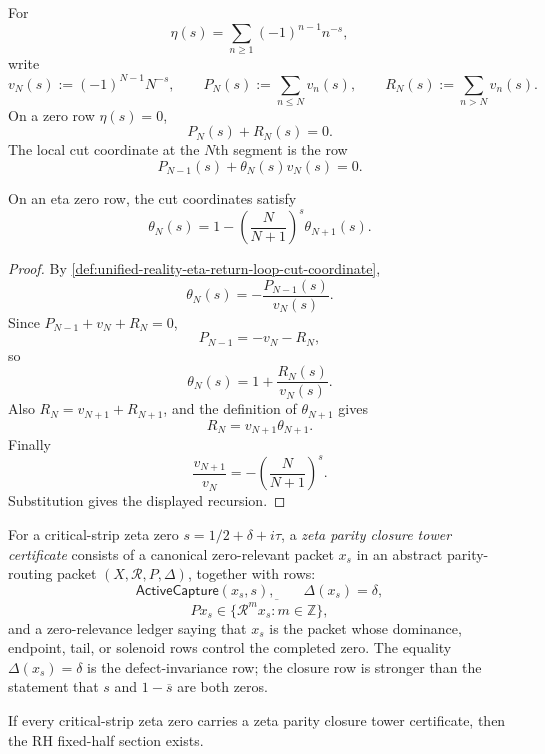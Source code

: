 \begin{definition}
\label{def:unified-reality-eta-return-loop-cut-coordinate}
For
$$
\eta(s)=\sum_{n\ge1}(-1)^{n-1}n^{-s},
$$
write
$$
v_N(s):=(-1)^{N-1}N^{-s},
\qquad
P_N(s):=\sum_{n\le N}v_n(s),
\qquad
R_N(s):=\sum_{n>N}v_n(s).
$$
On a zero row $\eta(s)=0$,
$$
P_N(s)+R_N(s)=0.
$$
The local cut coordinate at the $N$th segment is the row
$$
P_{N-1}(s)+\theta_N(s)v_N(s)=0.
$$
\end{definition}

\begin{theorem}
\label{thm:unified-reality-eta-cut-coordinates-exact-routing-recursion}
On an eta zero row, the cut coordinates satisfy
$$
\theta_N(s)
=
1-
\left(\frac{N}{N+1}\right)^s
\theta_{N+1}(s).
$$
\end{theorem}

\begin{proof}
By
\autoref{def:unified-reality-eta-return-loop-cut-coordinate},
$$
\theta_N(s)=-\frac{P_{N-1}(s)}{v_N(s)}.
$$
Since $P_{N-1}+v_N+R_N=0$,
$$
P_{N-1}=-v_N-R_N,
$$
so
$$
\theta_N(s)=1+\frac{R_N(s)}{v_N(s)}.
$$
Also $R_N=v_{N+1}+R_{N+1}$, and the definition of
$\theta_{N+1}$ gives
$$
R_N=v_{N+1}\theta_{N+1}.
$$
Finally
$$
\frac{v_{N+1}}{v_N}
=
-\left(\frac{N}{N+1}\right)^s.
$$
Substitution gives the displayed recursion.
\end{proof}

\begin{definition}
\label{def:unified-reality-zeta-parity-closure-tower-certificate}
For a critical-strip zeta zero $s=1/2+\delta+i\tau$, a
\emph{zeta parity closure tower certificate} consists of a canonical
zero-relevant packet $x_s$ in an abstract parity-routing packet
$(X,\mathcal R,P,\Delta)$, together with rows:
$$
\mathsf{ActiveCapture}(x_s,s),
\qquad
\Delta(x_s)=\delta,
$$
$$
P x_s\in\overline{\{\mathcal R^m x_s:m\in\mathbb Z\}},
$$
and a zero-relevance ledger saying that $x_s$ is the packet whose
dominance, endpoint, tail, or solenoid rows control the completed zero.
The equality $\Delta(x_s)=\delta$ is the defect-invariance row; the
closure row is stronger than the statement that $s$ and $1-\overline{s}$
are both zeros.
\end{definition}

\begin{theorem}
\label{thm:unified-reality-parity-closure-tower-certificates-conditionally-sufficient}
If every critical-strip zeta zero carries a zeta parity closure tower
certificate, then the RH fixed-half section exists.
\end{theorem}

